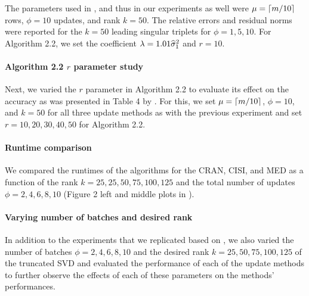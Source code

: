 The parameters used in \cite{Kalantzis2021}, and thus in our experiments as well were $\mu=\lceil m/10 \rceil$ rows, $\phi=10$ updates, and rank $k=50$.
The relative errors and residual norms were reported for the $k=50$ leading singular triplets for $\phi=1, 5, 10$.
For Algorithm 2.2, we set the coefficient $\lambda=1.01 {\widehat{\sigma}}_1^2$ and $r=10$.

\paragraph{Algorithm 2.2 $r$ parameter study}

Next, we varied the $r$ parameter in Algorithm 2.2 to evaluate its effect on the accuracy as was presented in Table 4 by \cite{Kalantzis2021}.
For this, we set $\mu=\lceil m/10 \rceil$, $\phi=10$, and $k=50$ for all three update methods as with the previous experiment and set $r=10,20,30,40,50$ for Algorithm 2.2.

\paragraph{Runtime comparison} 

We compared the runtimes of the algorithms for the CRAN, CISI, and MED as a function of the rank $k=25,25,50,75,100,125$ and the total number of updates $\phi=2,4,6,8,10$ (Figure 2 left and middle plots in \cite{Kalantzis2021}).

%
%
%
\paragraph{Varying number of batches and desired rank}

In addition to the experiments that we replicated based on \cite{Kalantzis2021}, we also varied the number of batches $\phi=2,4,6,8,10$ and the desired rank $k=25,50,75,100,125$ of the truncated SVD and evaluated the performance of each of the update methods to further observe the effects of each of these parameters on the methods' performances.
